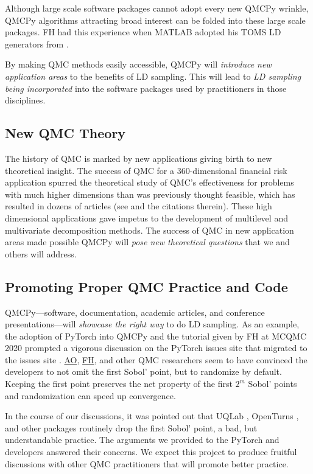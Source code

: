 \documentclass[11pt]{NSFamsart}
\newcommand{\FH}{\hyperlink{FHlink}{FH}\xspace}
\newcommand{\AO}{\hyperlink{AOlink}{AO}\xspace}
\begin{document}
Although large scale software packages cannot adopt every new QMCPy wrinkle, QMCPy algorithms attracting broad interest can be folded into these large scale packages.  FH had this experience when MATLAB adopted his TOMS LD generators from \cite{HonHic00a}.

By making QMC methods easily accessible, QMCPy will \emph{introduce new application areas} to the benefits of LD sampling.  This will lead to \emph{LD sampling being incorporated} into the software packages used by practitioners in those disciplines.  

\subsection{New QMC Theory}
The history of QMC is marked by new applications giving birth to new theoretical insight.  The success of QMC for a $360$-dimensional financial risk application \cite{PasTra95} spurred the theoretical study of QMC's effectiveness for problems with much higher dimensions than was previously thought feasible, which has resulted in dozens of articles (see \cite{NovWoz10a,DicEtal14a} and the citations therein).  These high dimensional applications gave impetus to the development of multilevel \cite{Gil15a} and multivariate decomposition \cite{KuoEtal17a} methods.  The success of QMC in new application areas made possible QMCPy will \emph{pose new theoretical questions} that we and others will address.

\subsection{Promoting Proper QMC Practice and Code}
QMCPy---software, documentation, academic articles, and conference presentations---will \emph{showcase the right way} to do LD sampling.  As an example, the adoption of PyTorch into QMCPy and the tutorial given by FH at MCQMC 2020 \cite{MCQMC2020QMCPyTut} prompted a vigorous discussion on the PyTorch issues site \cite{PyTorchFirstPt2020a} that migrated to the  issues site \cite{scipySobol2020a}.  \AO, \FH, and other QMC researchers seem to have convinced the developers to not omit the first Sobol' point, but to randomize by default.  Keeping the first point preserves the net property of the first $2^m$ Sobol' points and randomization can speed up convergence.  

In the course of our discussions, it was pointed out that UQLab \cite{UQLab}, OpenTurns \cite{OpenTURNS}, and other packages routinely drop the first Sobol' point, a bad, but understandable practice.  The arguments we provided to the PyTorch and  developers answered their concerns.  We expect this project to produce fruitful discussions with other QMC practitioners that will promote better practice.
\end{document}
